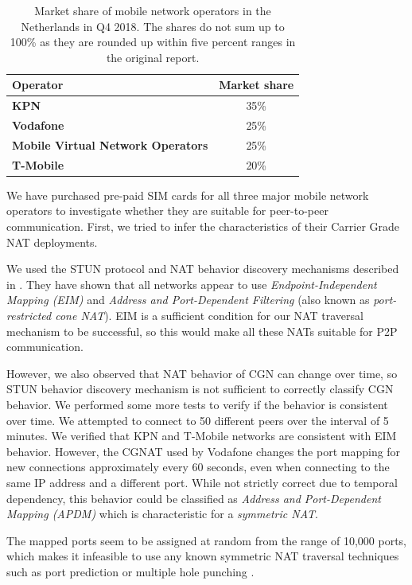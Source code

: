 \begin{table}
    \centering
    \begin{tabular}{ | l | c | }
        \hline
        \textbf{Operator} & \textbf{Market share} \\
        \hline
        \textbf{KPN} & 35\% \\
        \textbf{Vodafone} & 25\% \\
        \textbf{Mobile Virtual Network Operators} & 25\% \\
        \textbf{T-Mobile} & 20\% \\
        \hline
    \end{tabular}
    \caption{Market share of mobile network operators in the Netherlands in Q4 2018. The shares do not sum up to 100\% as they are rounded up within five percent ranges in the original report. \cite{statista:marketshare}}
    \label{table_marketshare}
\end{table}

We have purchased pre-paid SIM cards for all three major mobile network operators to investigate whether they are suitable for peer-to-peer communication. First, we tried to infer the characteristics of their Carrier Grade NAT deployments.

We used the STUN protocol and NAT behavior discovery mechanisms described in \cite{rfc5780}. They have shown that all networks appear to use \textit{Endpoint-Independent Mapping (EIM)} and \textit{Address and Port-Dependent Filtering} (also known as \textit{port-restricted cone NAT}). EIM is a sufficient condition for our NAT traversal mechanism to be successful, so this would make all these NATs suitable for P2P communication.

However, we also observed that NAT behavior of CGN can change over time, so STUN behavior discovery mechanism is not sufficient to correctly classify CGN behavior. We performed some more tests to verify if the behavior is consistent over time. We attempted to connect to 50 different peers over the interval of 5 minutes. We verified that KPN and T-Mobile networks are consistent with EIM behavior. However, the CGNAT used by Vodafone changes the port mapping for new connections approximately every 60 seconds, even when connecting to the same IP address and a different port. While not strictly correct due to temporal dependency, this behavior could be classified as \textit{Address and Port-Dependent Mapping (APDM)} which is characteristic for a \textit{symmetric NAT}.

The mapped ports seem to be assigned at random from the range of 10,000 ports, which makes it infeasible to use any known symmetric NAT traversal techniques such as port prediction or multiple hole punching \cite{multihole}\cite{takeda}.

